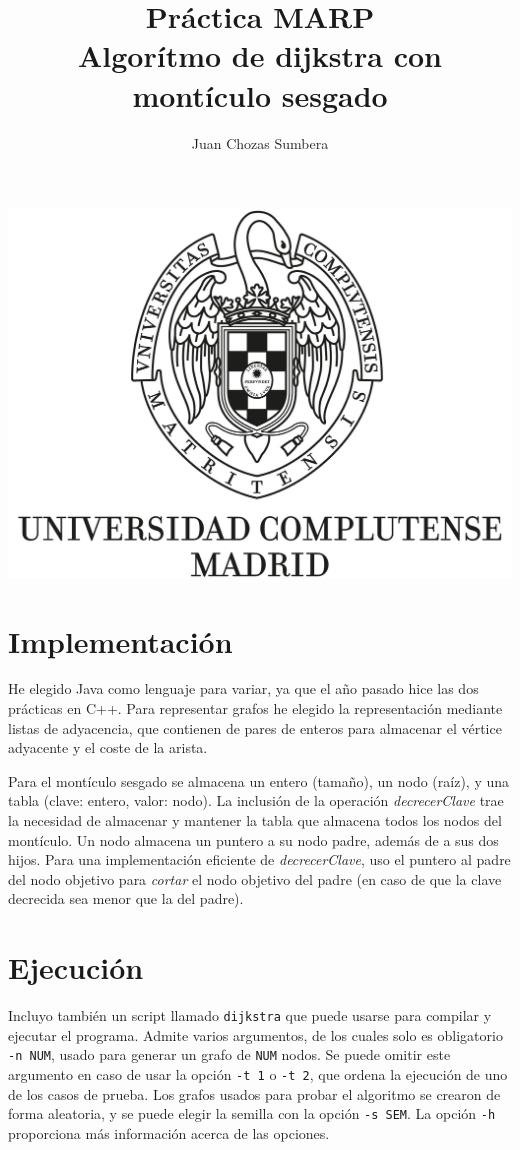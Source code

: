 \documentclass[12pt , a4paper]{article}
\title{Práctica MARP\\Algorítmo de dijkstra con montículo sesgado}
\author{Juan Chozas Sumbera}
\begin{document}
	
	\maketitle
	\begin{center}
		\includegraphics[width=\textwidth]{logo_UCM.jpg}
	\end{center}
	
	\newpage
	
\section{Implementación}
	
	He elegido Java como lenguaje para variar, ya que el año pasado hice las dos prácticas en C++. Para representar grafos he elegido la representación mediante listas de adyacencia, que contienen de pares de enteros para almacenar el vértice adyacente y el coste de la arista.
	
	Para el montículo sesgado se almacena un entero (tamaño), un nodo (raíz), y una tabla (clave: entero, valor: nodo). La inclusión de la operación \textit{decrecerClave} trae la necesidad de almacenar y mantener la tabla que almacena todos los nodos del montículo. Un nodo almacena un puntero a su nodo padre, además de a sus dos hijos. Para una implementación eficiente de \textit{decrecerClave}, uso el puntero al padre del nodo objetivo para \textit{cortar} el nodo objetivo del padre (en caso de que la clave decrecida sea menor que la del padre).
	
\section{Ejecución}
	Incluyo también un script llamado \texttt{dijkstra} que puede usarse para compilar y ejecutar el programa. Admite varios argumentos, de los cuales solo es obligatorio \texttt{-n NUM}, usado para generar un grafo de \texttt{NUM} nodos. Se puede omitir este argumento en caso de usar la opción \texttt{-t 1} o \texttt{-t 2}, que ordena la ejecución de uno de los casos de prueba. Los grafos usados para probar el algoritmo se crearon de forma aleatoria, y se puede elegir la semilla con la opción \texttt{-s SEM}. La opción \texttt{-h} proporciona más información acerca de las opciones.
	
\end{document}

